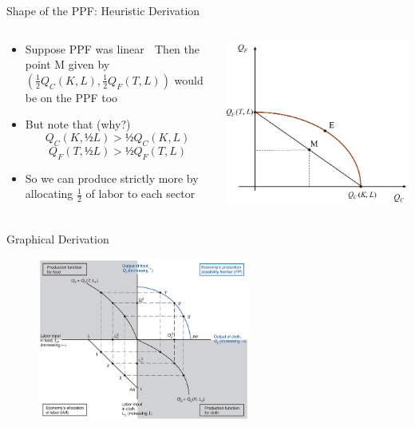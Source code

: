 \documentclass[10pt,hyperref={CJKbookmarks=true},xcolor=dvipsnames,aspectratio=169]{beamer}
\begin{document}
\begin{frame}{Shape of the PPF: Heuristic Derivation}


\begin{columns}[onlytextwidth]
\begin{column}{0.4\textwidth}
\begin{itemize}
\item Suppose PPF was linear  Then the point M given by $(\frac12 Q_{C}(K,L),\frac12 Q_{F}(T,L))$
would be on the PPF too 
\item But note that (why?) 
\[
Q_{C}(K,\text{½}L)>\text{½}Q_{C}(K,L)
\]
\[
Q_{F}(T,\text{½}L)>\text{½}Q_{F}(T,L)
\]

\item So we can produce strictly more by allocating $\frac12$ of labor
to each sector 
\end{itemize}

\end{column}
\begin{column}{0.6\textwidth}
\centering  \includegraphics[width=0.6\columnwidth]{fig/sfm/lec4-7}
\end{column}
\end{columns}

\end{frame}

\begin{frame}{Graphical Derivation}


\begin{figure}


\centering{}\includegraphics[width=7cm]{fig/sfm/lec4-8}
\end{figure}

\end{frame}
\end{document}
